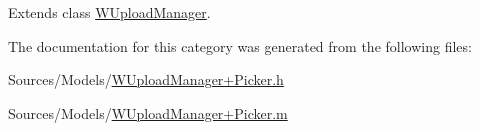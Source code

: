 Extends class \hyperlink{interface_w_upload_manager_a870f35ee39fa92fd49939ea31777bada}{W\-Upload\-Manager}.



The documentation for this category was generated from the following files\-:\begin{DoxyCompactItemize}
\item 
Sources/\-Models/\hyperlink{_w_upload_manager_09_picker_8h}{W\-Upload\-Manager+\-Picker.\-h}\item 
Sources/\-Models/\hyperlink{_w_upload_manager_09_picker_8m}{W\-Upload\-Manager+\-Picker.\-m}\end{DoxyCompactItemize}
